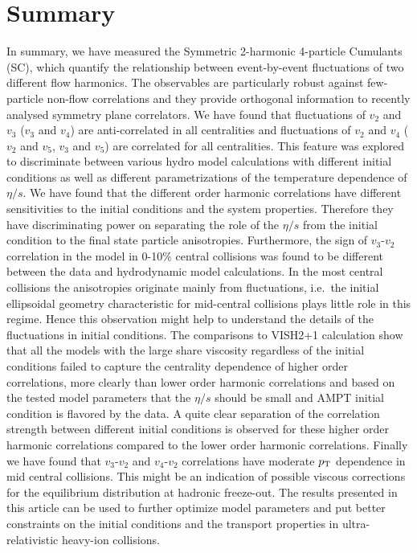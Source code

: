 \documentclass[ALICE,manyauthors]{cernphprep}
\begin{document}
\section{Summary}
\label{sec:summary}
In summary, we have measured the Symmetric 2-harmonic 4-particle Cumulants (SC), which quantify the relationship between event-by-event fluctuations of two different flow harmonics. The observables are particularly robust against few-particle non-flow correlations and they provide orthogonal information to recently analysed symmetry plane correlators. We have found that fluctuations of $v_2$ and $v_3$ ($v_3$ and $v_4$) are anti-correlated in all centralities and fluctuations of $v_2$ and $v_4$ ( $v_2$ and $v_5$, $v_3$ and $v_5$) are correlated for all centralities. 
This feature was explored to discriminate between various hydro model calculations with different initial conditions as well as different parametrizations of the temperature dependence of $\eta/s$.
We have found that the different order harmonic correlations have different sensitivities to the initial conditions and the system properties. Therefore they have discriminating power on separating the role of the $\eta/s$  from the initial condition to the final state particle anisotropies.
Furthermore, the sign of $v_3$-$v_2$ correlation in the model in 0-10\% central collisions was found to be different between the data and hydrodynamic model calculations.
In the most central collisions the anisotropies originate mainly from fluctuations, i.e.\ the initial ellipsoidal geometry characteristic for mid-central collisions plays little role in this regime. Hence this observation might help to understand the details of the fluctuations in initial conditions. 
The comparisons to VISH2+1 calculation show that all the models with the large share viscosity regardless of the initial conditions failed to capture the centrality dependence of higher order correlations, more clearly than lower order harmonic correlations and based on the tested model parameters that the $\eta/s$ should be small and AMPT initial condition is flavored by the data. A quite clear separation of the correlation strength between different initial conditions is observed for these higher order harmonic correlations compared to the lower order harmonic correlations.
Finally we have found that $v_3$-$v_2$ and $v_4$-$v_2$ correlations have moderate $p_{\rm T}$ dependence in mid central collisions. This might be an indication of possible viscous corrections for the equilibrium distribution at hadronic freeze-out.
The results presented in this article can be used to further optimize model parameters and put better constraints on the initial conditions and the transport properties in ultra-relativistic heavy-ion collisions.
\end{document}
